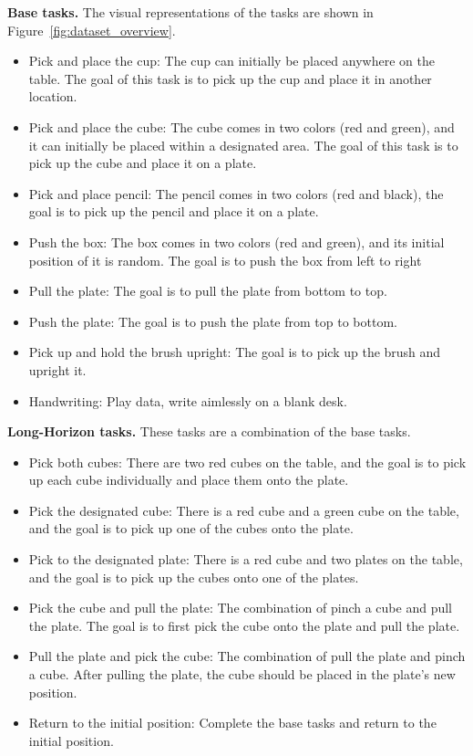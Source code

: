 \noindent\textbf{Base tasks.}
The visual representations of the tasks are shown in Figure~\ref{fig:dataset_overview}.
\begin{itemize}
    \item Pick and place the cup: The cup can initially be placed anywhere on the table. The goal of this task is to pick up the cup and place it in another location.
    \item Pick and place the cube: The cube comes in two colors (red and green), and it can initially be placed within a designated area. The goal of this task is to pick up the cube and place it on a plate.
    \item Pick and place pencil: The pencil comes in two colors (red and black), the goal is to pick up the pencil and place it on a plate.
    \item Push the box: The box comes in two colors (red and green), and its initial position of it is random. The goal is to push the box from left to right
    \item Pull the plate: The goal is to pull the plate from bottom to top.
    \item Push the plate: The goal is to push the plate from top to bottom.
    \item Pick up and hold the brush upright: The goal is to pick up the brush and upright it.
    \item Handwriting: Play data, write aimlessly on a blank desk.
\end{itemize}

\noindent\textbf{Long-Horizon tasks.}
These tasks are a combination of the base tasks.
\begin{itemize}
    \item Pick both cubes: There are two red cubes on the table, and the goal is to pick up each cube individually and place them onto the plate.
    \item Pick the designated cube: There is a red cube and a green cube on the table, and the goal is to pick up one of the cubes onto the plate.
    \item Pick to the designated plate: There is a red cube and two plates on the table, and the goal is to pick up the cubes onto one of the plates.
    \item Pick the cube and pull the plate: The combination of pinch a cube and pull the plate. The goal is to first pick the cube onto the plate and pull the plate.
    \item Pull the plate and pick the cube: The combination of pull the plate and pinch a cube. After pulling the plate, the cube should be placed in the plate's new position.
    \item Return to the initial position: Complete the base tasks and return to the initial position.
\end{itemize}

